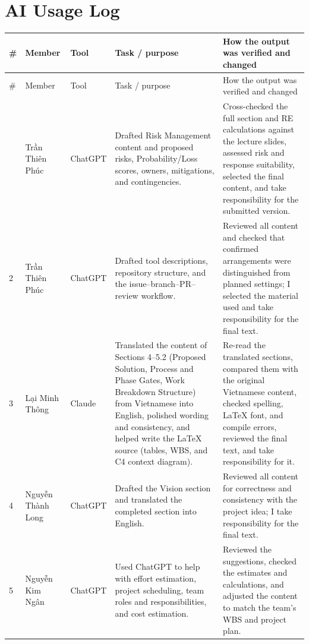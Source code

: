 \section{AI Usage Log}

\begingroup
\setlength{\tabcolsep}{2.5pt}
\renewcommand{\arraystretch}{1.12}
\setlength{\LTleft}{0pt}
\setlength{\LTright}{0pt}
\begin{longtable}{@{}L{0.05\textwidth}L{0.14\textwidth}L{0.12\textwidth}L{0.29\textwidth}L{0.355\textwidth}@{}}
\toprule
\# & Member & Tool & Task / purpose & How the output was verified and changed \\
\midrule
\endfirsthead
\toprule
\# & Member & Tool & Task / purpose & How the output was verified and changed \\
\midrule
\endhead
\midrule
\endfoot
\bottomrule
{} & Tr\`{\^a}n Thiên Phúc & ChatGPT & Drafted Risk Management content and proposed risks, Probability/Loss scores, owners, mitigations, and contingencies. & Cross-checked the full section and RE calculations against the lecture slides, assessed risk and response suitability, selected the final content, and take responsibility for the submitted version. \\
2 & Tr\`{\^a}n Thiên Phúc & ChatGPT & Drafted tool descriptions, repository structure, and the issue--branch--PR--review workflow. & Reviewed all content and checked that confirmed arrangements were distinguished from planned settings; I selected the material used and take responsibility for the final text. \\
3 & L\d{a}i Minh Th\^ong & Claude & Translated the content of Sections 4--5.2 (Proposed Solution, Process and Phase Gates, Work Breakdown Structure) from Vietnamese into English, polished wording and consistency, and helped write the LaTeX source (tables, WBS, and C4 context diagram). & Re-read the translated sections, compared them with the original Vietnamese content, checked spelling, LaTeX font, and compile errors, reviewed the final text, and take responsibility for it. \\
4 & Nguy\~{\^e}n Thành Long & ChatGPT & Drafted the Vision section and translated the completed section into English. & Reviewed all content for correctness and consistency with the project idea; I take responsibility for the final text. \\

5 & Nguy\~{\^e}n Kim Ng\^an & ChatGPT & Used ChatGPT to help with effort estimation, project scheduling, team roles and responsibilities, and cost estimation. & Reviewed the suggestions, checked the estimates and calculations, and adjusted the content to match the team's WBS and project plan. \\

\end{longtable}

\endgroup
\clearpage
